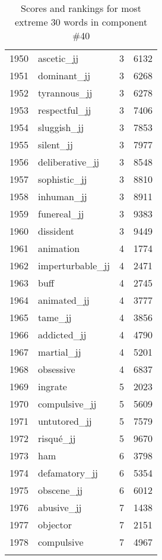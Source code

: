 \begin{longtable}[!htbp]{| rlr@{.}l |}
    1950 & ascetic\_jj & 3 & 6132 \\
    1951 & dominant\_jj & 3 & 6268 \\
    1952 & tyrannous\_jj & 3 & 6278 \\
    1953 & respectful\_jj & 3 & 7406 \\
    1954 & sluggish\_jj & 3 & 7853 \\
    1955 & silent\_jj & 3 & 7977 \\
    1956 & deliberative\_jj & 3 & 8548 \\
    1957 & sophistic\_jj & 3 & 8810 \\
    1958 & inhuman\_jj & 3 & 8911 \\
    1959 & funereal\_jj & 3 & 9383 \\
    1960 & dissident & 3 & 9449 \\
    1961 & animation & 4 & 1774 \\
    1962 & imperturbable\_jj & 4 & 2471 \\
    1963 & buff & 4 & 2745 \\
    1964 & animated\_jj & 4 & 3777 \\
    1965 & tame\_jj & 4 & 3856 \\
    1966 & addicted\_jj & 4 & 4790 \\
    1967 & martial\_jj & 4 & 5201 \\
    1968 & obsessive & 4 & 6837 \\
    1969 & ingrate & 5 & 2023 \\
    1970 & compulsive\_jj & 5 & 5609 \\
    1971 & untutored\_jj & 5 & 7579 \\
    1972 & risqué\_jj & 5 & 9670 \\
    1973 & ham & 6 & 3798 \\
    1974 & defamatory\_jj & 6 & 5354 \\
    1975 & obscene\_jj & 6 & 6012 \\
    1976 & abusive\_jj & 7 & 1438 \\
    1977 & objector & 7 & 2151 \\
    1978 & compulsive & 7 & 4967 \\
    \hline
    \caption{Scores and rankings for most extreme 30 words in component \#40} \\
\end{longtable}
